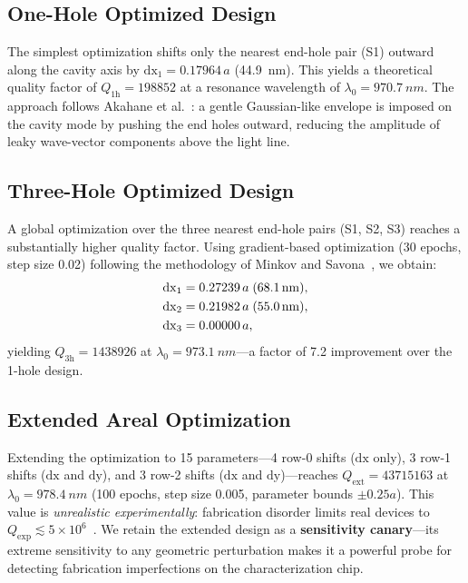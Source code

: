 \documentclass[11pt,a4paper]{article}
\begin{document}
\subsection{One-Hole Optimized Design}
\label{sec:1hole}

The simplest optimization shifts only the nearest end-hole pair (S1) outward along the cavity axis by $\mathrm{dx}_1 = 0.17964\,a$ (\SI{44.9}{nm}). This yields a theoretical quality factor of $Q_{1\mathrm{h}} = \num{198852}$ at a resonance wavelength of $\lambda_0 = \SI{970.7}{nm}$. The approach follows Akahane et al.~\cite{akahane2003}: a gentle Gaussian-like envelope is imposed on the cavity mode by pushing the end holes outward, reducing the amplitude of leaky wave-vector components above the light line.

\subsection{Three-Hole Optimized Design}
\label{sec:3hole}

A global optimization over the three nearest end-hole pairs (S1, S2, S3) reaches a substantially higher quality factor. Using gradient-based optimization (30 epochs, step size 0.02) following the methodology of Minkov and Savona~\cite{minkov2014}, we obtain:
\begin{align}
  \mathrm{dx}_1 &= 0.27239\,a \;(\SI{68.1}{nm}), \notag \\
  \mathrm{dx}_2 &= 0.21982\,a \;(\SI{55.0}{nm}), \label{eq:3hole_shifts} \\
  \mathrm{dx}_3 &= 0.00000\,a, \notag
\end{align}
yielding $Q_{3\mathrm{h}} = \num{1438926}$ at $\lambda_0 = \SI{973.1}{nm}$---a factor of 7.2 improvement over the 1-hole design.

\subsection{Extended Areal Optimization}
\label{sec:extended}

Extending the optimization to 15 parameters---4 row-0 shifts ($\mathrm{dx}$ only), 3 row-1 shifts ($\mathrm{dx}$ and $\mathrm{dy}$), and 3 row-2 shifts ($\mathrm{dx}$ and $\mathrm{dy}$)---reaches $Q_\mathrm{ext} = \num{43715163}$ at $\lambda_0 = \SI{978.4}{nm}$ (100 epochs, step size 0.005, parameter bounds $\pm 0.25a$). This value is \emph{unrealistic experimentally}: fabrication disorder limits real devices to $Q_\mathrm{exp} \lesssim 5 \times 10^6$~\cite{asano2021}. We retain the extended design as a \textbf{sensitivity canary}---its extreme sensitivity to any geometric perturbation makes it a powerful probe for detecting fabrication imperfections on the characterization chip.
\end{document}
